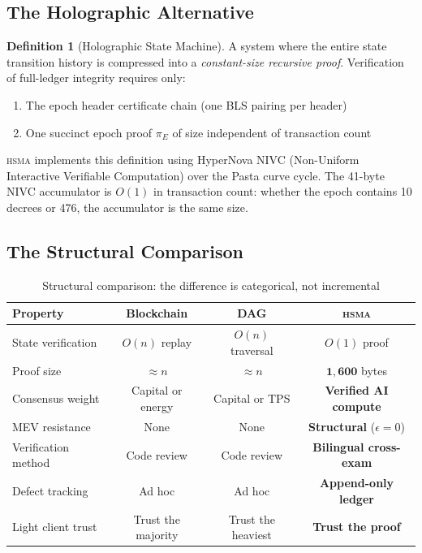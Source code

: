 \documentclass[11pt, a4paper]{article}
\theoremstyle{plain}
\theoremstyle{definition}
\newtheorem{definition}{Definition}
\theoremstyle{remark}
\newcommand{\hsma}{\textsc{hsma}}
\begin{document}
\subsection{The Holographic Alternative}

\begin{definition}[Holographic State Machine]
\label{def:holographic}
A system where the entire state transition history is compressed into
a \emph{constant-size recursive proof}. Verification of full-ledger
integrity requires only:
\begin{enumerate}
\item The epoch header certificate chain (one BLS pairing per header)
\item One succinct epoch proof $\pi_E$ of size independent of
transaction count
\end{enumerate}
\end{definition}

\hsma{} implements this definition using HyperNova NIVC (Non-Uniform
Interactive Verifiable Computation) over the Pasta curve cycle. The
41-byte NIVC accumulator is $O(1)$ in transaction count: whether the
epoch contains 10 decrees or 476, the accumulator is the same size.

\subsection{The Structural Comparison}

\begin{table}[h]
\centering
{}
\begin{tabular}{lccc}
\toprule
\rowcolor{hsmaBlue!20} \textbf{Property} & \textbf{Blockchain} &
\textbf{DAG} & \color{hsmaBlue}\textbf{\hsma{}} \\
\midrule
State verification & $O(n)$ replay & $O(n)$ traversal & $O(1)$ proof \\
Proof size & $\approx n$ & $\approx n$ & $\mathbf{1{,}600}$ bytes \\
Consensus weight & Capital or energy & Capital or TPS & \textbf{Verified AI compute} \\
MEV resistance & None & None & \textbf{Structural} ($\epsilon{=}0$) \\
Verification method & Code review & Code review & \textbf{Bilingual cross-exam} \\
Defect tracking & Ad hoc & Ad hoc & \textbf{Append-only ledger} \\
Light client trust & Trust the majority & Trust the heaviest & \textbf{Trust the proof} \\
\bottomrule
\end{tabular}
\caption{Structural comparison: the difference is categorical, not incremental}
\end{table}
\end{document}

